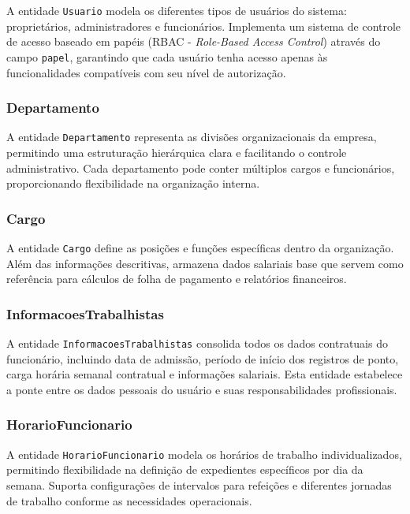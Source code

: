 A entidade \texttt{Usuario} modela os diferentes tipos de usuários do sistema: proprietários, administradores e funcionários. Implementa um sistema de controle de acesso baseado em papéis (RBAC - \textit{Role-Based Access Control}) através do campo \texttt{papel}, garantindo que cada usuário tenha acesso apenas às funcionalidades compatíveis com seu nível de autorização.

\subsubsection{Departamento}

A entidade \texttt{Departamento} representa as divisões organizacionais da empresa, permitindo uma estruturação hierárquica clara e facilitando o controle administrativo. Cada departamento pode conter múltiplos cargos e funcionários, proporcionando flexibilidade na organização interna.

\subsubsection{Cargo}

A entidade \texttt{Cargo} define as posições e funções específicas dentro da organização. Além das informações descritivas, armazena dados salariais base que servem como referência para cálculos de folha de pagamento e relatórios financeiros.

\subsubsection{InformacoesTrabalhistas}

A entidade \texttt{InformacoesTrabalhistas} consolida todos os dados contratuais do funcionário, incluindo data de admissão, período de início dos registros de ponto, carga horária semanal contratual e informações salariais. Esta entidade estabelece a ponte entre os dados pessoais do usuário e suas responsabilidades profissionais.

\subsubsection{HorarioFuncionario}

A entidade \texttt{HorarioFuncionario} modela os horários de trabalho individualizados, permitindo flexibilidade na definição de expedientes específicos por dia da semana. Suporta configurações de intervalos para refeições e diferentes jornadas de trabalho conforme as necessidades operacionais.

